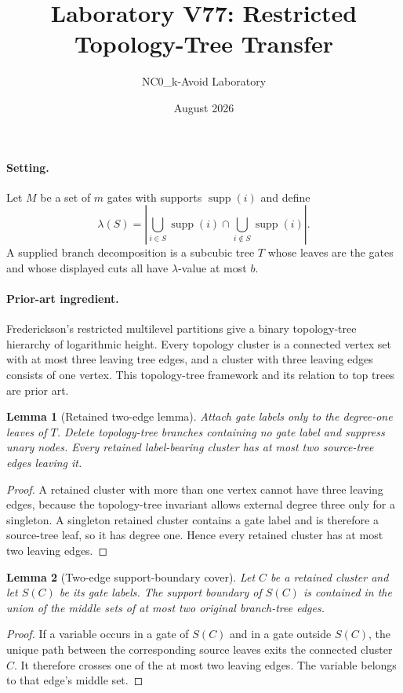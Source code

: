 \documentclass[11pt]{article}
\title{Laboratory V77: Restricted Topology-Tree Transfer}
\author{NC0\_k-Avoid Laboratory}
\date{August 2026}
\newtheorem{lemma}{Lemma}
\begin{document}
\maketitle

\paragraph{Setting.}
Let $M$ be a set of $m$ gates with supports $\operatorname{supp}(i)$ and define
\[
 \lambda(S)=\left|\bigcup_{i\in S}\operatorname{supp}(i)
 \cap \bigcup_{i\notin S}\operatorname{supp}(i)\right|.
\]
A supplied branch decomposition is a subcubic tree $T$ whose leaves are the
gates and whose displayed cuts all have $\lambda$-value at most $b$.

\paragraph{Prior-art ingredient.}
Frederickson's restricted multilevel partitions give a binary topology-tree
hierarchy of logarithmic height. Every topology cluster is a connected vertex
set with at most three leaving tree edges, and a cluster with three leaving
edges consists of one vertex. This topology-tree framework and its relation
to top trees are prior art.

\begin{lemma}[Retained two-edge lemma]
Attach gate labels only to the degree-one leaves of $T$. Delete topology-tree
branches containing no gate label and suppress unary nodes. Every retained
label-bearing cluster has at most two source-tree edges leaving it.
\end{lemma}

\begin{proof}
A retained cluster with more than one vertex cannot have three leaving edges,
because the topology-tree invariant allows external degree three only for a
singleton. A singleton retained cluster contains a gate label and is therefore
a source-tree leaf, so it has degree one. Hence every retained cluster has at
most two leaving edges.
\end{proof}

\begin{lemma}[Two-edge support-boundary cover]
Let $C$ be a retained cluster and let $S(C)$ be its gate labels. The support
boundary of $S(C)$ is contained in the union of the middle sets of at most two
original branch-tree edges.
\end{lemma}

\begin{proof}
If a variable occurs in a gate of $S(C)$ and in a gate outside $S(C)$, the
unique path between the corresponding source leaves exits the connected
cluster $C$. It therefore crosses one of the at most two leaving edges. The
variable belongs to that edge's middle set.
\end{proof}
\end{document}
